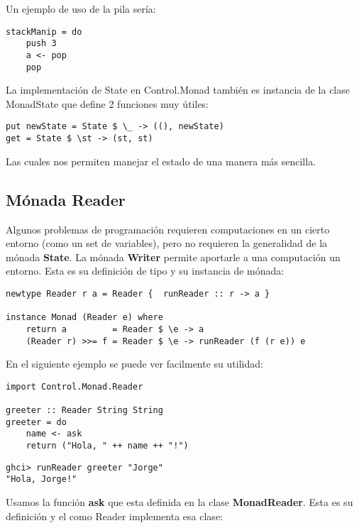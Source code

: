 Un ejemplo de uso de la pila sería:

\begin{lstlisting}
stackManip = do
    push 3
    a <- pop
    pop
\end{lstlisting}

La implementación de State en Control.Monad también es instancia de la clase
MonadState que define 2 funciones muy útiles:

\begin{lstlisting}
put newState = State $ \_ -> ((), newState)
get = State $ \st -> (st, st)
\end{lstlisting}

Las cuales nos permiten manejar el estado de una manera más sencilla.


\subsection{Mónada Reader} %
\label{sub:m_nada_reader}

Algunos problemas de programación requieren computaciones en un cierto entorno (como un set de variables), pero no requieren la generalidad de la mónada \textbf{State}. La mónada \textbf{Writer} permite aportarle a una computación un entorno. Esta es su definición de tipo y su instancia de mónada:

\begin{lstlisting}
newtype Reader r a = Reader {  runReader :: r -> a }

instance Monad (Reader e) where
    return a         = Reader $ \e -> a
    (Reader r) >>= f = Reader $ \e -> runReader (f (r e)) e
\end{lstlisting}

En el siguiente ejemplo se puede ver facilmente su utilidad:

\begin{lstlisting}
import Control.Monad.Reader

greeter :: Reader String String
greeter = do
    name <- ask
    return ("Hola, " ++ name ++ "!")
\end{lstlisting}

\begin{lstlisting}
ghci> runReader greeter "Jorge"
"Hola, Jorge!"
\end{lstlisting}

Usamos la función \textbf{ask} que esta definida en la clase \textbf{MonadReader}. Esta es su definición y el como Reader implementa esa clase:

